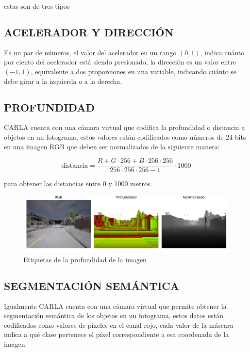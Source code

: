 estas son de tres tipos

\subsection{ACELERADOR Y DIRECCIÓN}
Es un par de números, el valor del acelerador en un rango $(0, 1)$, indica cuánto por ciento del acelerador está siendo presionado, la dirección es un valor entre $(-1, 1)$, equivalente a dos proporciones en una variable, indicando cuánto se debe girar a la izquierda o a la derecha.

\subsection{PROFUNDIDAD}
CARLA cuenta con una cámara virtual que codifica la profundidad o distancia a objetos en un fotograma, estos valores están codificados como números de 24 bits en una imagen RGB que deben ser normalizados de la siguiente manera:

$$\text{distancia} = \frac{R + G\cdot256 + B\cdot256\cdot256}{256\cdot256\cdot256 - 1} \cdot 1000$$

para obtener las distancias entre 0 y 1000 metros.

\begin{figure}[H]
	\centering
	\includegraphics[scale=0.62]{imagenes/depth}
	\caption[Etiquetas de profundidad imagen]{Etiquetas de la profundidad de la imagen}
	\label{depth}
\end{figure}

\subsection{SEGMENTACIÓN SEMÁNTICA}
Igualmente CARLA cuenta con una cámara virtual que permite obtener la segmentación semántica de los objetos en un fotograma, estos datos están codificados como valores de píxeles en el canal rojo, cada valor de la máscara indica a qué clase pertenece el píxel correspondiente a esa coordenada de la imagen.

